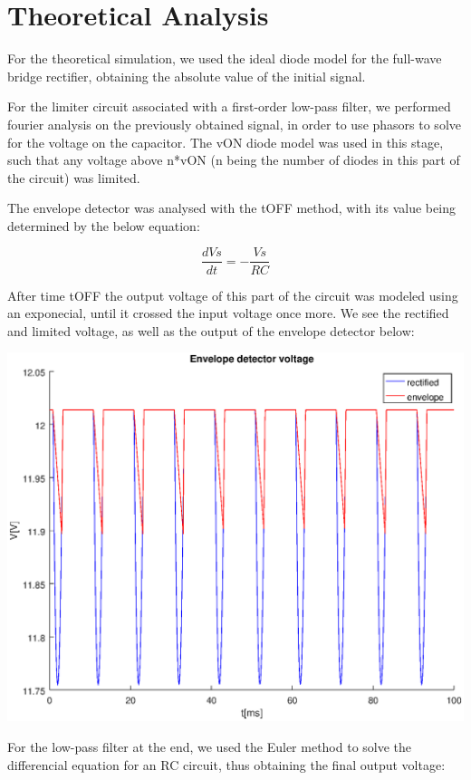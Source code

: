 \section{Theoretical Analysis}
\label{sec:analysis}

For the theoretical simulation, we used the ideal diode model for the full-wave bridge rectifier, obtaining the absolute value of the initial signal.

For the limiter circuit associated with a first-order low-pass filter, we performed fourier analysis on the previously obtained signal, in order to use phasors to solve for the voltage on the capacitor.
The vON diode model was used in this stage, such that any voltage above n*vON (n being the number of diodes in this part of the circuit) was limited.

The envelope detector was analysed with the tOFF method, with its value being determined by the below equation:

\begin{equation}
	\frac{dVs}{dt}=-\frac{Vs}{RC}
\end{equation}

After time tOFF the output voltage of this part of the circuit was modeled using an exponecial, until it crossed the input voltage once more.
We see the rectified and limited voltage, as well as the output of the envelope detector below:

\includegraphics[width=1\linewidth]{venvelope.eps}

For the low-pass filter at the end, we used the Euler method to solve the differencial equation for an RC circuit, thus obtaining the final output voltage:

